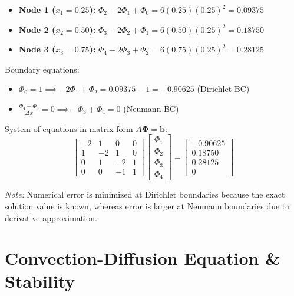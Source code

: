 \documentclass{article}
\begin{document}
\begin{itemize}
    \item \textbf{Node 1 ($x_1 = 0.25$):} $\Phi_2 - 2\Phi_1 + \Phi_0 = 6(0.25)(0.25)^2 = 0.09375$
    \item \textbf{Node 2 ($x_2 = 0.50$):} $\Phi_3 - 2\Phi_2 + \Phi_1 = 6(0.50)(0.25)^2 = 0.18750$
    \item \textbf{Node 3 ($x_3 = 0.75$):} $\Phi_4 - 2\Phi_3 + \Phi_2 = 6(0.75)(0.25)^2 = 0.28125$
\end{itemize}

Boundary equations:
\begin{itemize}
    \item $\Phi_0 = 1 \implies -2\Phi_1 + \Phi_2 = 0.09375 - 1 = -0.90625$ (Dirichlet BC)
    \item $\frac{\Phi_4 - \Phi_3}{\Delta x} = 0 \implies -\Phi_3 + \Phi_4 = 0$ (Neumann BC)
\end{itemize}

System of equations in matrix form $A\mathbf{\Phi} = \mathbf{b}$:
\begin{equation}
    \begin{bmatrix}
        -2 & 1  & 0  & 0 \\
        1  & -2 & 1  & 0 \\
        0  & 1  & -2 & 1 \\
        0  & 0  & -1 & 1
    \end{bmatrix}
    \begin{bmatrix}
        \Phi_1 \\ \Phi_2 \\ \Phi_3 \\ \Phi_4
    \end{bmatrix}
    =
    \begin{bmatrix}
        -0.90625 \\ 0.18750 \\ 0.28125 \\ 0
    \end{bmatrix}
\end{equation}

\textit{Note:} Numerical error is minimized at Dirichlet boundaries because the exact solution value is known, whereas error is larger at Neumann boundaries due to derivative approximation.

\section{Convection-Diffusion Equation \& Stability}
\end{document}
